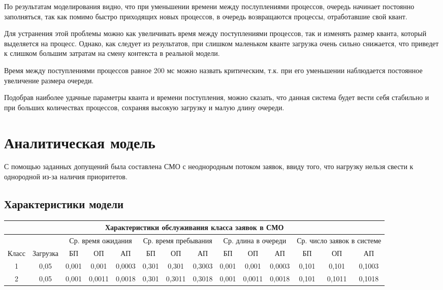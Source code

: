 По результатам моделирования видно, что при уменьшении времени между послуплениями
процессов, очередь начинает постоянно заполняться, так как помимо быстро приходящих
новых процессов, в очередь возвращаются процессы, отработавшие свой квант.

Для устранения этой проблемы можно как увеличивать время между поступлениями
процессов, так и изменять размер кванта, который выделяется на процесс. Однако,
как следует из результатов, при слишком маленьком кванте загрузка очень сильно
снижается, что приведет к слишком большим затратам на смену контекста в реальной модели.

Время между поступлениями процессов равное 200 мс можно назвать критическим,
т.к. при его уменьшении наблюдается постоянное увеличение размера очереди.

Подобрав наиболее удачные параметры кванта и времени поступления, можно сказать,
что данная система будет вести себя стабильно и при больших количествах процессов,
сохраняя высокую загрузку и малую длину очереди.



\newpage
\section{Аналитическая модель}
С помощью заданных допущений была составлена СМО с неоднородным потоком заявок,
ввиду того, что нагрузку нельзя свести к однородной из-за наличия приоритетов.

\subsection{Характеристики модели}

\begin{adjustbox}{max width=\textwidth}
\begin{tabular}{|c|c|c|c|c|c|c|c|c|c|c|c|c|c|}
\hline
\multicolumn{14}{|c|}{Характеристики обслуживания класса заявок в СМО} \\ \hline
& & \multicolumn{3}{|c|}{Ср. время ожидания} & \multicolumn{3}{|c|}{Ср. время пребывания} & \multicolumn{3}{|c|}{Ср. длина в очереди} & \multicolumn{3}{|c|}{Ср. число заявок в системе} \\ \hline
Класс & Загрузка & БП & ОП & АП & БП & ОП & АП & БП & ОП & АП & БП & ОП & АП \\ \hline
1 & 0,05 & 0,001 & 0,001 & 0,0003 & 0,301 & 0,301 & 0,3003 & 0,001 & 0,001 & 0,0003 & 0,101 & 0,101 & 0,1003 \\ \hline
2 & 0,05 & 0,001 & 0,0011 & 0,0018 & 0,301 & 0,3011 & 0,3018 & 0,001 & 0,0011 & 0,0018 & 0,101 & 0,1011 & 0,1018 \\ \hline
\end{tabular}
\end{adjustbox}
\\

